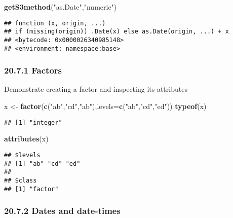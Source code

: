 \documentclass[
]{article}
\newenvironment{Shaded}{\begin{snugshade}}{\end{snugshade}}
\newcommand{\AttributeTok}[1]{\textcolor[rgb]{0.13,0.29,0.53}{#1}}
\newcommand{\FunctionTok}[1]{\textcolor[rgb]{0.13,0.29,0.53}{\textbf{#1}}}
\newcommand{\NormalTok}[1]{#1}
\newcommand{\OtherTok}[1]{\textcolor[rgb]{0.56,0.35,0.01}{#1}}
\newcommand{\StringTok}[1]{\textcolor[rgb]{0.31,0.60,0.02}{#1}}
\begin{document}
\begin{Shaded}
\begin{Highlighting}[]
\FunctionTok{getS3method}\NormalTok{(}\StringTok{"as.Date"}\NormalTok{,}\StringTok{"numeric"}\NormalTok{)}
\end{Highlighting}
\end{Shaded}

\begin{verbatim}
## function (x, origin, ...) 
## if (missing(origin)) .Date(x) else as.Date(origin, ...) + x
## <bytecode: 0x0000026340985148>
## <environment: namespace:base>
\end{verbatim}

\hypertarget{factors}{%
\subsubsection{20.7.1 Factors}\label{factors}}

Demonstrate creating a factor and inspecting its attributes

\begin{Shaded}
\begin{Highlighting}[]
\NormalTok{x }\OtherTok{\textless{}{-}} \FunctionTok{factor}\NormalTok{(}\FunctionTok{c}\NormalTok{(}\StringTok{"ab"}\NormalTok{,}\StringTok{"cd"}\NormalTok{,}\StringTok{"ab"}\NormalTok{),}\AttributeTok{levels=}\FunctionTok{c}\NormalTok{(}\StringTok{"ab"}\NormalTok{,}\StringTok{"cd"}\NormalTok{,}\StringTok{"ed"}\NormalTok{))}
\FunctionTok{typeof}\NormalTok{(x)}
\end{Highlighting}
\end{Shaded}

\begin{verbatim}
## [1] "integer"
\end{verbatim}

\begin{Shaded}
\begin{Highlighting}[]
\FunctionTok{attributes}\NormalTok{(x)}
\end{Highlighting}
\end{Shaded}

\begin{verbatim}
## $levels
## [1] "ab" "cd" "ed"
## 
## $class
## [1] "factor"
\end{verbatim}

\hypertarget{dates-and-date-times}{%
\subsubsection{20.7.2 Dates and date-times}\label{dates-and-date-times}}
\end{document}
